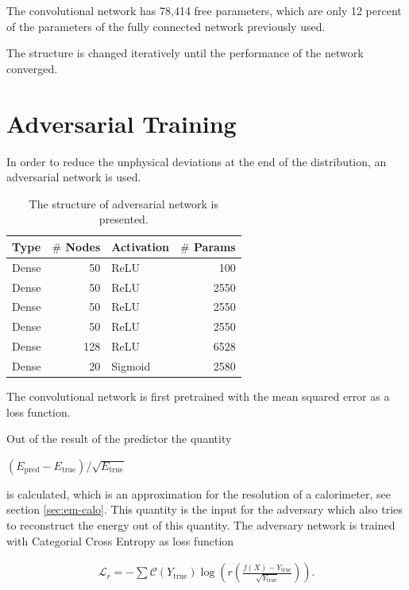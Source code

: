 \documentclass[12pt, a4paper]{thesis}
\begin{document}
The convolutional network has 78,414 free parameters, which are only
12 percent of the parameters of the fully connected network previously
used.

The structure is changed iteratively until the performance of the
network converged.

\clearpage
\section{Adversarial Training}
\label{sec:org30a0273}

In order to reduce the unphysical deviations at the end of the
distribution, an adversarial network is used.


\begin{table}[htbp]
  \centering
  \begin{tabular}{lrlr}
    Type & \(\#\) Nodes & Activation & \(\#\) Params\\
    \hline
    Dense & 50 & ReLU & 100\\
    Dense & 50 & ReLU & 2550\\
    Dense & 50 & ReLU & 2550\\
    Dense & 50 & ReLU & 2550\\
    Dense & 128& ReLU & 6528\\
    Dense & 20 & Sigmoid & 2580\\ 
  \end{tabular}
  \caption{The structure of adversarial network is presented.}
  \label{adv_structure}
\end{table}


The convolutional network is first pretrained with the mean squared
error as a loss function.

Out of the result of the predictor the quantity

\((E_{\text{pred}}-E_{\text{true}})/\sqrt{E_{\text{true}}}\)

is calculated, which is an approximation for the resolution of a
calorimeter, see section \ref{sec:em-calo}. This quantity is the input
for the adversary which also tries to reconstruct the energy out of
this quantity. The adversary network is trained with Categorial Cross
Entropy as loss function

\begin{align}
\mathcal{L}_r = - \sum \mathcal{C}\left(Y_{\text{true}}\right)
\log(r\left(\frac{f(X)-Y_{\text{true}}}{\sqrt{Y_{\text{true}}}}\right)).
\end{align}
\end{document}
